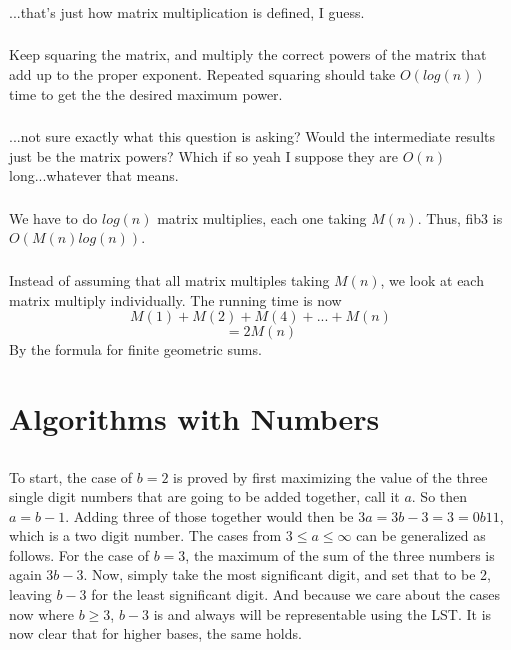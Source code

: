 \documentclass{article}
\begin{document}
\subsubsection{}...that's just how matrix multiplication is defined, I guess.
\subsubsection{}Keep squaring the matrix, and multiply the correct powers of the matrix that add up to the proper exponent. Repeated squaring should take $O(log(n))$ time to get the the desired maximum power.
\subsubsection{}...not sure exactly what this question is asking? Would the intermediate results just be the matrix powers? Which if so yeah I suppose they are $O(n)$ long...whatever that means. 
\subsubsection{}We have to do $log(n)$ matrix multiplies, each one taking $M(n)$. Thus, fib3 is $O(M(n)log(n))$.
\subsubsection{}Instead of assuming that all matrix multiples taking $M(n)$, we look at each matrix multiply individually. The running time is now $$M(1)+M(2)+M(4)+...+M(n)$$
$$=2M(n)$$
By the formula for finite geometric sums. 
\section{Algorithms with Numbers}
\subsection{} To start, the case of $b=2$ is proved by first maximizing the value of the three single digit numbers that are going to be added together, call it $a$. So then $a=b-1$. Adding three of those together would then be $3a=3b-3=3=0b11$, which is a two digit number. The cases from $3 \leq a \leq \infty$ can be generalized as follows. For the case of $b=3$, the maximum of the sum of the three numbers is again $3b-3$. Now, simply take the most significant digit, and set that to be 2, leaving $b-3$ for the least significant digit. And because we care about the cases now where $b \geq 3$, $b-3$ is and always will be representable using the LST. It is now clear that for higher bases, the same holds. 
\end{document}
